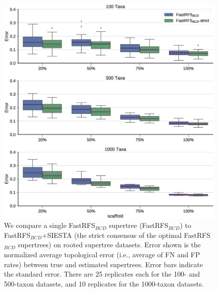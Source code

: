 \begin{figure}[ht]
  \centering
\includegraphics[width=1\textwidth]{siesta-figs/fastrfs-bcd-siesta-comparison}
\caption[Error rates for FastRFS$_{BCD}$ and FastRFS$_{BCD}$+SIESTA (strict consensus) on simulated datasets]{We compare a single FastRFS$_{BCD}$ supertree (FastRFS$_{BCD}$) to FastRFS$_{BCD}$+SIESTA (the strict consensus of the optimal FastRFS$_{BCD}$ supertrees)  on rooted supertree datasets.
Error shown is the normalized average topological error (i.e., average of FN and FP rates) between true and estimated supertrees.
Error bars indicate the standard error. 
There are 25 replicates each for the 100- and 500-taxon datasets, and 10 replicates for the 1000-taxon datasets.
  }
     \label{siesta::fig:supertree-error-rooted}
\end{figure}




